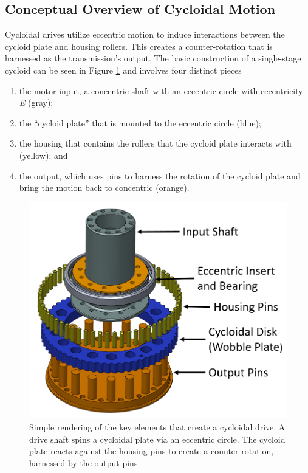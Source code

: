 \subsection{Conceptual Overview of Cycloidal Motion} \label{ch:design:basic_calc:overview}

Cycloidal drives utilize eccentric motion to induce interactions between the cycloid plate and housing rollers. This creates a counter-rotation that is harnessed as the transmission's output. The basic construction of a single-stage cycloid can be seen in Figure \ref{fig:single_cartoon} and involves four distinct pieces
\begin{enumerate}
	\item the motor input, a concentric shaft with an eccentric circle with eccentricity \textit{E} (gray);
	\item the ``cycloid plate'' that is mounted to the eccentric circle (blue);
	\item the housing that contains the rollers that the cycloid plate interacts with (yellow); and
	\item the output, which uses pins to harness the rotation of the cycloid plate and bring the motion back to concentric (orange).
\end{enumerate}

\begin{figure}[t]
   \centering
   \includegraphics[width=0.60\linewidth]{fig/cycloid_cartoon_v2}
   \caption{Simple rendering of the key elements that create a cycloidal drive.
   A drive shaft spins a cycloidal plate via an eccentric circle.
   The cycloid plate reacts against the housing pins to create a counter-rotation, harnessed by the output pins.}
   \label{fig:single_cartoon}
\end{figure}


